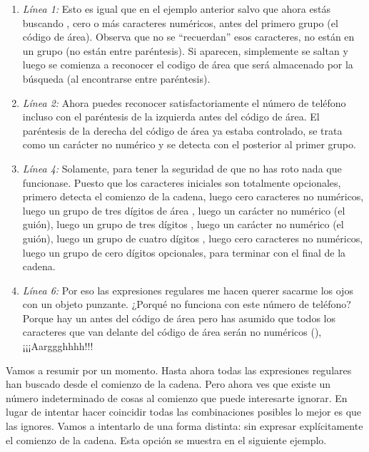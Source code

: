 \begin{enumerate}

\item \emph{Línea 1:} Esto es igual que en el ejemplo anterior salvo que ahora estás buscando , cero o más caracteres numéricos, antes del primero grupo (el código de área). Observa que no se ``recuerdan'' esos caracteres, no están en un grupo (no están entre paréntesis). Si aparecen, simplemente se saltan y luego se comienza a reconocer el codigo de área que será almacenado por la búsqueda (al encontrarse entre paréntesis). 

\item \emph{Línea 2:} Ahora puedes reconocer satisfactoriamente el número de teléfono incluso con el paréntesis de la izquierda antes del código de área. El paréntesis de la derecha del código de área ya estaba controlado, se trata como un carácter no numérico y se detecta con el  posterior al primer grupo.

\item \emph{Línea 4:} Solamente, para tener la seguridad de que no has roto nada que funcionase. Puesto que los caracteres iniciales son totalmente opcionales, primero detecta el comienzo de la cadena, luego cero caracteres no numéricos, luego un grupo de tres dígitos de área , luego un carácter no numérico (el guión), luego un grupo de tres dígitos , luego un carácter no numérico (el guión), luego un grupo de cuatro dígitos , luego cero caracteres no numéricos, luego un grupo de cero dígitos opcionales, para terminar con el final de la cadena.

\item \emph{Línea 6:} Por eso las expresiones regulares me hacen querer sacarme los ojos con un objeto punzante. ¿Porqué no funciona con este número de teléfono? Porque hay un  antes del código de área pero has asumido que todos los caracteres que van delante del código de área serán no numéricos (), ¡¡¡Aarggghhhh!!!

\end{enumerate}

Vamos a resumir por un momento. Hasta ahora todas las expresiones regulares han buscado desde el comienzo de la cadena. Pero ahora ves que existe un número indeterminado de cosas al comienzo que puede interesarte ignorar. En lugar de intentar hacer coincidir todas las combinaciones posibles lo mejor es que las ignores. Vamos a intentarlo de una forma distinta: sin expresar explícitamente el comienzo de la cadena. Esta opción se muestra en el siguiente ejemplo.

